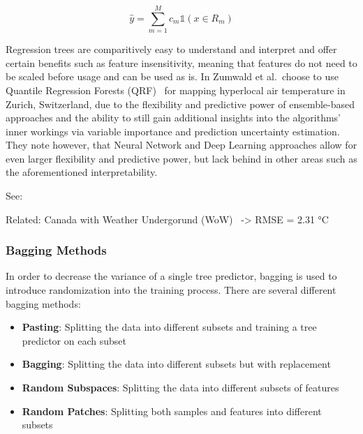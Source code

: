 \begin{equation}
    \hat{y} = \sum_{m=1}^M c_m \mathbb{1}(x \in R_m)
\end{equation}

Regression trees are comparitively easy to understand and interpret and offer certain benefits such as feature insensitivity, meaning that features do not need to be scaled before usage and can be used as is. In \cite{zumwald2021mapping} Zumwald et al.\ choose to use Quantile Regression Forests (QRF)~\cite{meinshausen2006quantile} for mapping hyperlocal air temperature in Zurich, Switzerland, due to the flexibility and predictive power of ensemble-based approaches and the ability to still gain additional insights into the algorithms' inner workings via variable importance and prediction uncertainty estimation. They note however, that Neural Network and Deep Learning approaches allow for even larger flexibility and predictive power, but lack behind in other areas such as the aforementioned interpretability.

See: \cite{apaydin2022evaluation}

Related: Canada with Weather Undergorund (WoW)~\cite{ho2014mapping} -> RMSE = 2.31 °C


\subsubsection{Bagging Methods}

In order to decrease the variance of a single tree predictor, bagging is used to introduce randomization into the training process. There are several different bagging methods:

\begin{itemize}
    \item \textbf{Pasting}: Splitting the data into different subsets and training a tree predictor on each subset~\cite{breiman1999pasting}
    \item \textbf{Bagging}: Splitting the data into different subsets but with replacement~\cite{breiman1996bagging}
    \item \textbf{Random Subspaces}: Splitting the data into different subsets of features~\cite{ho1998random}
    \item \textbf{Random Patches}: Splitting both samples and features into different subsets~\cite{louppe2012ensembles}
\end{itemize}



